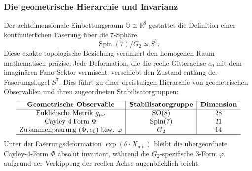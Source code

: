 \documentclass[11pt,a4paper]{article}
\theoremstyle{definition}
\begin{document}
	\subsubsection{Die geometrische Hierarchie und Invarianz}
	Der achtdimensionale Einbettungsraum $\mathbb{O} \cong \mathbb{R}^8$ gestattet die Definition einer kontinuierlichen Faserung über die 7-Sphäre:
	\begin{equation}
		\operatorname{Spin}(7)/G_2 \simeq S^7.
	\end{equation}
	Diese exakte topologische Beziehung verankert den homogenen Raum mathematisch präzise. Jede Deformation, die die reelle Gitterachse $e_0$ mit dem imaginären Fano-Sektor vermischt, verschiebt den Zustand entlang der Faserungskugel $S^7$. Dies führt zu einer dreistufigen Hierarchie von geometrischen Observablen und ihren zugeordneten Stabilisatorgruppen:
	\begin{equation}
		\begin{array}{c|c|c}
			\hline
			\textbf{Geometrische Observable} & \textbf{Stabilisatorgruppe} & \textbf{Dimension} \\
			\hline
			\text{Euklidische Metrik } g_{\mu\nu} & \mathrm{SO}(8) & 28 \\
			\text{Cayley-4-Form } \Phi & \mathrm{Spin}(7) & 21 \\
			\text{Zusammenpaarung } (\Phi, e_0) \text{ bzw. } \varphi & G_2 & 14 \\
			\hline
		\end{array}
	\end{equation}
	Unter der Faserungsdeformation $\exp(\theta \cdot X_{\text{mix}})$ bleibt die übergeordnete Cayley-4-Form $\Phi$ absolut invariant, während die $G_2$-spezifische 3-Form $\varphi$ aufgrund der Verkippung der reellen Achse augenblicklich bricht.
	
\end{document}
